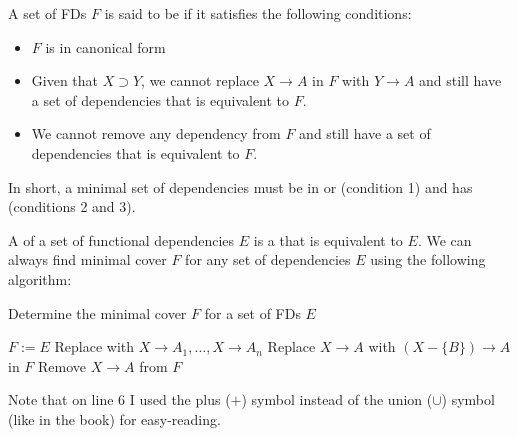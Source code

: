      \par A set of FDs $F$ is said to be  if it satisfies the following conditions:
      \begin{itemize}
        \item $F$ is in canonical form
        \item Given that $X \supset Y$, we cannot replace $X \to A$ in $F$ with $Y \to A$ and still have a set of dependencies that is equivalent to $F$.
        \item We cannot remove any dependency from $F$ and still have a set of dependencies that is equivalent to $F$.
      \end{itemize}
      \par In short, a minimal set of dependencies must be in  or  (condition 1) and has  (conditions 2 and 3).

      \par A  of a set of functional dependencies $E$ is a  that is equivalent to $E$. We can always find  minimal cover $F$ for any set of dependencies $E$ using the following algorithm:
        \begin{algorithm}[H]
          \caption{Determine the minimal cover $F$ for a set of FDs $E$}
          \begin{algorithmic}[1]
            \State $F := E$
              \State Replace with $X \to A_1, \ldots, X \to A_n$
            \EndFor
                  \State Replace $X \to A$ with $(X - \{B\}) \to A$ in $F$
                \EndIf
              \EndFor
            \EndFor
                \State Remove $X \to A$ from $F$
              \EndIf
            \EndFor
          \end{algorithmic}
        \end{algorithm}
      \par Note that on line 6 I used the plus ($+$) symbol instead of the union ($\cup$) symbol (like in the book) for easy-reading.

